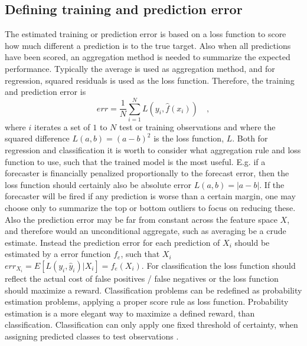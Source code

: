 \subsection{Defining training and prediction error}
The estimated training or prediction error is based on a loss function to score how much different a prediction is to the true target. Also when all predictions have been scored, an aggregation method is needed to summarize the expected performance. Typically the average is used as aggregation method, and for regression, squared residuals is used as the loss function. Therefore, the training and prediction error is
\begin{equation}
err = \frac 1 N \sum_{i=1}^N L(y_i,\hat{f}(x_i)) \quad ,
\end{equation}
where $i$ iterates a set of $1$ to $N$ test or training observations and where the squared difference  $L(a,b) = (a-b)^2$ is the loss function, $L$. Both for regression and classification it is worth to consider what aggregation rule and loss function to use, such that the trained model is the most useful. E.g. if a forecaster is financially penalized proportionally to the forecast error, then the loss function should certainly also be absolute error $L(a,b) = |a-b|$. If the forecaster will be fired if any prediction is worse than a certain margin, one may choose only to summarize the top or bottom outliers to focus on reducing these. Also the prediction error may be far from constant across the feature space $X$, and therefore would an unconditional aggregate, such as averaging be a crude estimate. Instead the prediction error for each prediction of $X_i$ should be estimated by a error function $f_e$, such that $X_i$ $err_{X_i} = E[L(y_i,\hat{y}_i)|X_i] = f_e(X_i)$. For classification the loss function should reflect the actual cost of false positives / false negatives or the loss function should maximize a reward. Classification problems can be redefined as probability estimation problems, applying a proper score rule as loss function. Probability estimation is a more elegant way to maximize a defined reward, than classification. Classification can only apply one fixed threshold of certainty, when assigning predicted classes to test observations \cite{harrell1984regression}.
